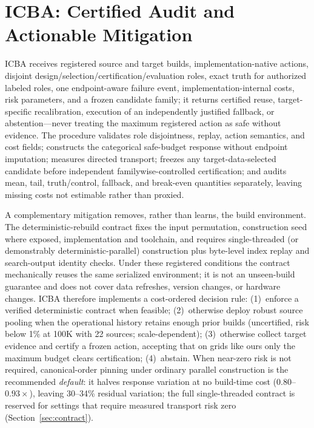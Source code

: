 \documentclass{article}
\begin{document}
\section{ICBA: Certified Audit and Actionable Mitigation}
\label{sec:icba}

ICBA receives registered source and target builds, implementation-native actions, disjoint
design/selection/certification/evaluation roles, exact truth for authorized labeled roles, one
endpoint-aware failure event, implementation-internal costs, risk parameters, and a frozen candidate
family; it returns certified reuse, target-specific recalibration, execution of an independently justified
fallback, or abstention---never treating the maximum registered action as safe without evidence. The
procedure validates role disjointness, replay, action semantics, and cost fields; constructs the
categorical safe-budget response without endpoint imputation; measures directed transport; freezes any
target-data-selected candidate before independent familywise-controlled certification; and audits mean,
tail, truth/control, fallback, and break-even quantities separately, leaving missing costs not estimable
rather than proxied.

A complementary mitigation removes, rather than learns, the build environment. The deterministic-rebuild
contract fixes the input permutation, construction seed where exposed, implementation and toolchain, and
requires single-threaded (or demonstrably deterministic-parallel) construction plus byte-level index replay
and search-output identity checks. Under these registered conditions the contract mechanically reuses the
same serialized environment; it is not an unseen-build guarantee and does not cover data refreshes, version
changes, or hardware changes. ICBA therefore implements a cost-ordered decision rule:
(1)~enforce a verified deterministic contract when feasible;
(2)~otherwise deploy robust source pooling when the operational history retains enough prior builds
(uncertified, risk below 1\% at 100K with 22 sources; scale-dependent);
(3)~otherwise collect target evidence and certify a frozen action, accepting that on grids like ours only
the maximum budget clears certification;
(4)~abstain. When near-zero risk is not required, canonical-order pinning under ordinary parallel construction is the
recommended \emph{default}: it halves response variation at no build-time cost ($0.80$--$0.93\times$),
leaving 30--34\% residual variation; the full single-threaded contract is reserved for settings that
require measured transport risk zero (Section~\ref{sec:contract}).
\end{document}
